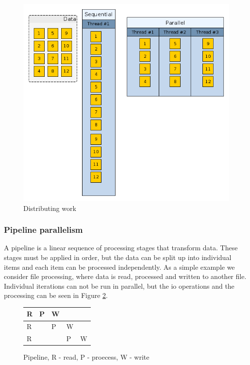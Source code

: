 \begin{figure}
	\centering
	\includegraphics[width=1\textwidth]{seqtopar}
	\caption{Distributing work}
	\label{cap2:datapar}
\end{figure}

\subsubsection{Pipeline parallelism}

A pipeline \cite{parbook} is a linear sequence of processing stages that transform data. These stages must be applied in order, but the data can be split up into individual items and each item can be processed independently. As a simple example we consider file processing, where data is read, processed and written to another file. Individual iterations can not be run in parallel, but the io operations and the processing can be seen in Figure \ref{cap2:pipeline}.

\begin{figure}[!ht]
	\centering
	\begin{tabular}{ l | l | l | l | l}
		R & P & W & & \\
		\hline
		R &  & P & W & \\
		\hline
		R &  & & P & W \\
	\end{tabular}
	\caption{Pipeline, R - read, P - proecess, W - write}
	\label{cap2:pipeline}
\end{figure}

